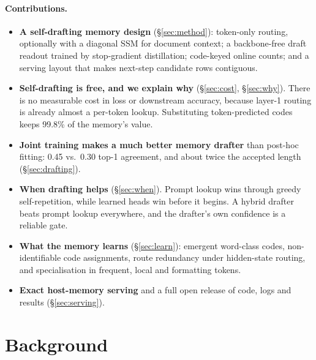 \documentclass[11pt]{article}
\begin{document}
\paragraph{Contributions.}
\begin{itemize}
\setlength\itemsep{1pt}
\item \textbf{A self-drafting memory design} (\S\ref{sec:method}): token-only routing, optionally with a diagonal SSM
for document context; a backbone-free draft readout trained by stop-gradient distillation; code-keyed online counts; and
a serving layout that makes next-step candidate rows contiguous.
\item \textbf{Self-drafting is free, and we explain why} (\S\ref{sec:cost}, \S\ref{sec:why}). There is no measurable cost in loss or downstream
accuracy, because layer-1 routing is already almost a per-token lookup. Substituting token-predicted codes keeps 99.8\% of the memory's value.
\item \textbf{Joint training makes a much better memory drafter} than post-hoc fitting: 0.45 vs.\ 0.30 top-1 agreement, and
about twice the accepted length (\S\ref{sec:drafting}).
\item \textbf{When drafting helps} (\S\ref{sec:when}). Prompt lookup wins through greedy self-repetition, while learned
heads win before it begins. A hybrid drafter beats prompt lookup everywhere, and the drafter's own confidence is a reliable
gate.
\item \textbf{What the memory learns} (\S\ref{sec:learn}): emergent word-class codes, non-identifiable code
assignments, route redundancy under hidden-state routing, and specialisation in frequent, local and formatting tokens.
\item \textbf{Exact host-memory serving} and a full open release of code, logs and results (\S\ref{sec:serving}).
\end{itemize}

\section{Background}
\label{sec:background}
\end{document}
